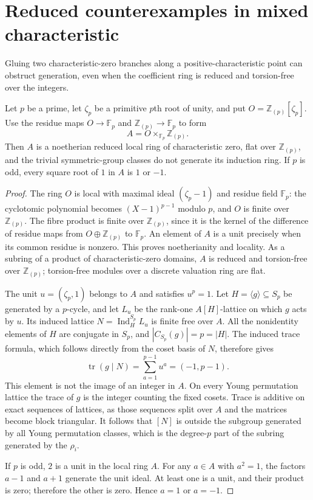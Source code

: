 \section{Reduced counterexamples in mixed characteristic}

Gluing two characteristic-zero branches along a positive-characteristic
point can obstruct generation, even when the coefficient ring is
reduced and torsion-free over the integers.

\begin{proposition}\label{prop:reduced-fiber-product}
Let $p$ be a prime, let $\zeta_p$ be a primitive $p$th root of unity,
and put $O=\mathbb Z_{(p)}[\zeta_p]$.  Use the residue maps
$O\to\mathbb F_p$ and $\mathbb Z_{(p)}\to\mathbb F_p$ to form
\[
 A=O\times_{\mathbb F_p}\mathbb Z_{(p)}.
\]
Then $A$ is a noetherian reduced local ring of characteristic zero,
flat over $\mathbb Z_{(p)}$, and the trivial symmetric-group classes
do not generate its induction ring.  If $p$ is odd, every square
root of $1$ in $A$ is $1$ or $-1$.
\end{proposition}

\begin{proof}
The ring $O$ is local with maximal ideal $(\zeta_p-1)$ and residue
field $\mathbb F_p$: the cyclotomic polynomial becomes
$(X-1)^{p-1}$ modulo $p$, and $O$ is finite over $\mathbb Z_{(p)}$.
The fibre product is finite over $\mathbb Z_{(p)}$, since it is the
kernel of the difference of residue maps from
$O\oplus\mathbb Z_{(p)}$ to $\mathbb F_p$.  An element of $A$ is a
unit precisely when its common residue is nonzero.  This proves
noetherianity and locality.  As a subring of a product of
characteristic-zero domains, $A$ is reduced and torsion-free over
$\mathbb Z_{(p)}$; torsion-free modules over a discrete valuation
ring are flat.

The unit $u=(\zeta_p,1)$ belongs to $A$ and satisfies $u^p=1$.
Let $H=\langle g\rangle\subseteq S_p$ be generated by a $p$-cycle,
and let $L_u$ be the rank-one $A[H]$-lattice on which $g$ acts by
$u$.  Its induced lattice
$N=\operatorname{Ind}_H^{S_p}L_u$ is finite free over $A$.
All the nonidentity elements of $H$ are conjugate in $S_p$, and
$|C_{S_p}(g)|=p=|H|$.  The induced trace formula, which follows
directly from the coset basis of $N$, therefore gives
\[
 \operatorname{tr}(g\mid N)=\sum_{a=1}^{p-1}u^a=(-1,p-1).
\]
This element is not the image of an integer in $A$.  On every
Young permutation lattice the trace of $g$ is the integer counting
the fixed cosets.  Trace is additive on exact sequences of lattices,
as those sequences split over $A$ and the matrices become block
triangular.  It follows that $[N]$ is outside the subgroup generated
by all Young permutation classes, which is the degree-$p$ part of
the subring generated by the $\rho_i$.

If $p$ is odd, $2$ is a unit in the local ring $A$.  For any
$a\in A$ with $a^2=1$, the factors $a-1$ and $a+1$ generate the
unit ideal.  At least one is a unit, and their product is zero;
therefore the other is zero.  Hence $a=1$ or $a=-1$.
\end{proof}
